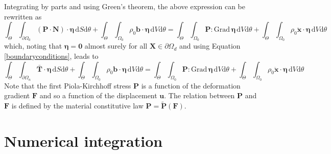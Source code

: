 \documentclass[oneside,11pt,times]{book}
\begin{document}
Integrating by parts and using Green's theorem, the above expression can be rewritten as
%
\begin{equation} \label{equationWeakBalanceMomentum1}
 \int_{\Theta} \int_{\partial \Omega_0} (\bm{P} \cdot \bm{N}) \cdot \bm{\eta} \, \text{d} S \text{d}\theta + \int_{\Theta} \int_{\Omega_0} \rho_0 \bm{b} \cdot \bm{\eta}  \, \text{d} V \text{d}\theta = \int_{\Theta} \int_{\Omega_0} \bm{P} : \text{Grad} \, \bm{\eta} \, \text{d} V \text{d}\theta + \int_{\Theta} \int_{\Omega_0} \rho_0 \ddot{\bm{x}} \cdot \bm{\eta}  \, \text{d} V \text{d}\theta
\end{equation}
%
which, noting that $\bm{\eta} = \bm{0}$ almost surely for all $\bm{X} \in \partial \Omega_d$ and using Equation \eqref{boundaryconditions}, leads to
%
\begin{equation} \label{equationWeakBalanceMomentum2}
  \int_{\Theta} \int_{\partial \Omega_n} \bar{\bm{T}} \cdot \bm{\eta} \, \text{d} S \text{d}\theta  +  \int_{\Theta} \int_{\Omega_0} \rho_0 \bm{b} \cdot \bm{\eta}  \, \text{d} V \text{d}\theta  =  \int_{\Theta} \int_{\Omega_0} \bm{P} : \text{Grad} \, \bm{\eta} \, \text{d} V \text{d}\theta  +  \int_{\Theta} \int_{\Omega_0} \rho_0 \ddot{\bm{x}} \cdot \bm{\eta}  \, \text{d} V \text{d}\theta
\end{equation}
%
Note that the first Piola-Kirchhoff stress $\bm{P}$ is a function of the deformation gradient $\bm{F}$ and so a function of the displacement $\bm{u}$. The relation between $\bm{P}$ and $\bm{F}$ is defined by the material constitutive law $\bm{P} = \tilde{\bm{P}}(\bm{F})$.

\section{Numerical integration}\label{sectionNumerical integration}
\end{document}
